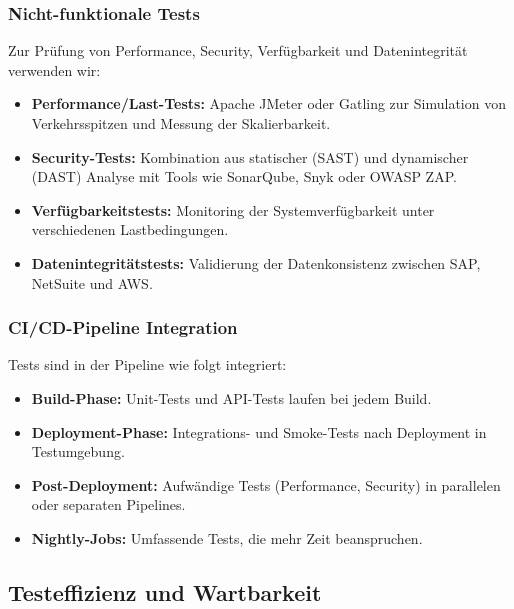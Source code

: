 \subsubsection{Nicht-funktionale Tests}
Zur Prüfung von Performance, Security, Verfügbarkeit und Datenintegrität verwenden wir:
\begin{itemize}
    \item \textbf{Performance/Last-Tests:} Apache JMeter oder Gatling zur Simulation von Verkehrsspitzen und Messung der Skalierbarkeit.
    \item \textbf{Security-Tests:} Kombination aus statischer (SAST) und dynamischer (DAST) Analyse mit Tools wie SonarQube, Snyk oder OWASP ZAP.
    \item \textbf{Verfügbarkeitstests:} Monitoring der Systemverfügbarkeit unter verschiedenen Lastbedingungen.
    \item \textbf{Datenintegritätstests:} Validierung der Datenkonsistenz zwischen SAP, NetSuite und AWS.
\end{itemize}
\subsubsection{CI/CD-Pipeline Integration}
Tests sind in der Pipeline wie folgt integriert:
\begin{itemize}
    \item \textbf{Build-Phase:} Unit-Tests und API-Tests laufen bei jedem Build.
    \item \textbf{Deployment-Phase:} Integrations- und Smoke-Tests nach Deployment in Testumgebung.
    \item \textbf{Post-Deployment:} Aufwändige Tests (Performance, Security) in parallelen oder separaten Pipelines.
    \item \textbf{Nightly-Jobs:} Umfassende Tests, die mehr Zeit beanspruchen.
\end{itemize}
\subsection{Testeffizienz und Wartbarkeit}
